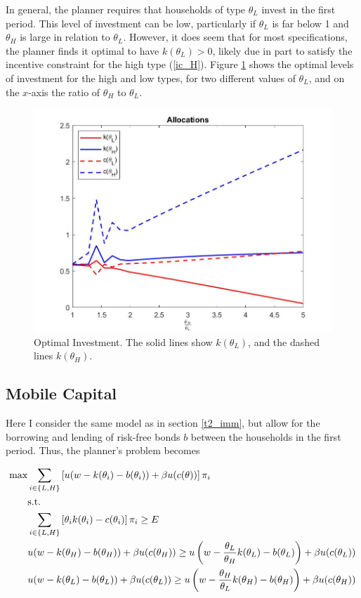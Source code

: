 \documentclass[11pt]{article}
\begin{document}
In general, the planner requires that households of type \( \theta_L \) invest in the first period. This level of investment can be low, particularly if \( \theta_L \) is far below 1 and \( \theta_H \) is large in relation to \( \theta_L \). However, it does seem that for most specifications, the planner finds it optimal to have \( k(\theta_L) > 0 \), likely due in part to satisfy the incentive constraint for the high type (\ref{ic_H}). Figure \ref{fig_imm} shows the optimal levels of investment for the high and low types, for two different values of \( \theta_L \), and on the \( x \)-axis the ratio of \( \theta_H \) to \( \theta_L \).
%
\begin{figure}[!ht]
    \centering
    \includegraphics[scale = 0.5]{figures/immob.jpg}
    \caption{Optimal Investment. The solid lines show \( k(\theta_L) \), and the dashed lines \( k(\theta_H) \).}
    \label{fig_imm}
\end{figure}

\subsection{Mobile Capital} \label{t2_mob}

Here I consider the same model as in section \ref{t2_imm}, but allow for the borrowing and lending of risk-free bonds \( b \) between the households in the first period. Thus, the planner's problem becomes

\begin{align}
    \max &\sum_{i \in\{L,H\}}\left[ u(w - k(\theta_i) - b(\theta_i)) + \beta u(c(\theta)) \right]\pi_i \\ 
    &\text{s.t.} \notag \\
    &\sum_{i \in\{L,H\}}\left[ \theta_i k(\theta_i) - c(\theta_i) \right]\pi_i \ge E \\
    &u(w - k(\theta_H) - b(\theta_H)) + \beta u(c(\theta_H)) \ge u\left( w - \frac{\theta_L}{\theta_H}k(\theta_L) - b(\theta_L)\right) + \beta u(c(\theta_L)) \\
    &u(w - k(\theta_L) - b(\theta_L)) + \beta u(c(\theta_L)) \ge u\left( w - \frac{\theta_H}{\theta_L}k(\theta_H) - b(\theta_H) \right) + \beta u(c(\theta_H)) 
\end{align}
\end{document}
